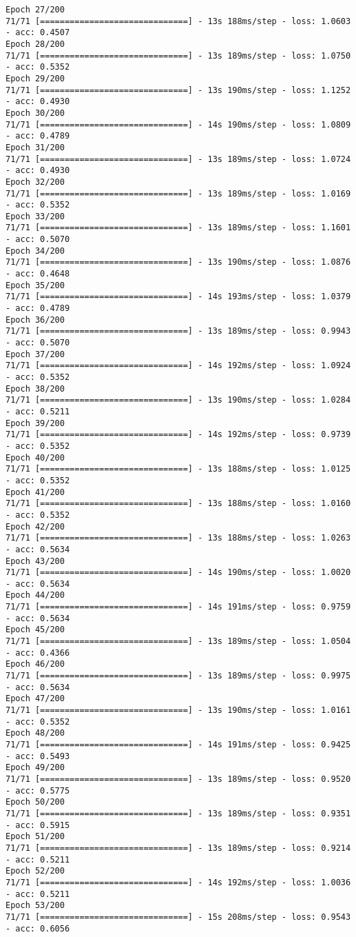 \documentclass[11pt]{article}
\begin{document}
\begin{Verbatim}[commandchars=\\\{\}]
Epoch 27/200
71/71 [==============================] - 13s 188ms/step - loss: 1.0603 - acc: 0.4507
Epoch 28/200
71/71 [==============================] - 13s 189ms/step - loss: 1.0750 - acc: 0.5352
Epoch 29/200
71/71 [==============================] - 13s 190ms/step - loss: 1.1252 - acc: 0.4930
Epoch 30/200
71/71 [==============================] - 14s 190ms/step - loss: 1.0809 - acc: 0.4789
Epoch 31/200
71/71 [==============================] - 13s 189ms/step - loss: 1.0724 - acc: 0.4930
Epoch 32/200
71/71 [==============================] - 13s 189ms/step - loss: 1.0169 - acc: 0.5352
Epoch 33/200
71/71 [==============================] - 13s 189ms/step - loss: 1.1601 - acc: 0.5070
Epoch 34/200
71/71 [==============================] - 13s 190ms/step - loss: 1.0876 - acc: 0.4648
Epoch 35/200
71/71 [==============================] - 14s 193ms/step - loss: 1.0379 - acc: 0.4789
Epoch 36/200
71/71 [==============================] - 13s 189ms/step - loss: 0.9943 - acc: 0.5070
Epoch 37/200
71/71 [==============================] - 14s 192ms/step - loss: 1.0924 - acc: 0.5352
Epoch 38/200
71/71 [==============================] - 13s 190ms/step - loss: 1.0284 - acc: 0.5211
Epoch 39/200
71/71 [==============================] - 14s 192ms/step - loss: 0.9739 - acc: 0.5352
Epoch 40/200
71/71 [==============================] - 13s 188ms/step - loss: 1.0125 - acc: 0.5352
Epoch 41/200
71/71 [==============================] - 13s 188ms/step - loss: 1.0160 - acc: 0.5352
Epoch 42/200
71/71 [==============================] - 13s 188ms/step - loss: 1.0263 - acc: 0.5634
Epoch 43/200
71/71 [==============================] - 14s 190ms/step - loss: 1.0020 - acc: 0.5634
Epoch 44/200
71/71 [==============================] - 14s 191ms/step - loss: 0.9759 - acc: 0.5634
Epoch 45/200
71/71 [==============================] - 13s 189ms/step - loss: 1.0504 - acc: 0.4366
Epoch 46/200
71/71 [==============================] - 13s 189ms/step - loss: 0.9975 - acc: 0.5634
Epoch 47/200
71/71 [==============================] - 13s 190ms/step - loss: 1.0161 - acc: 0.5352
Epoch 48/200
71/71 [==============================] - 14s 191ms/step - loss: 0.9425 - acc: 0.5493
Epoch 49/200
71/71 [==============================] - 13s 189ms/step - loss: 0.9520 - acc: 0.5775
Epoch 50/200
71/71 [==============================] - 13s 189ms/step - loss: 0.9351 - acc: 0.5915
Epoch 51/200
71/71 [==============================] - 13s 189ms/step - loss: 0.9214 - acc: 0.5211
Epoch 52/200
71/71 [==============================] - 14s 192ms/step - loss: 1.0036 - acc: 0.5211
Epoch 53/200
71/71 [==============================] - 15s 208ms/step - loss: 0.9543 - acc: 0.6056

\end{Verbatim}
\end{document}
